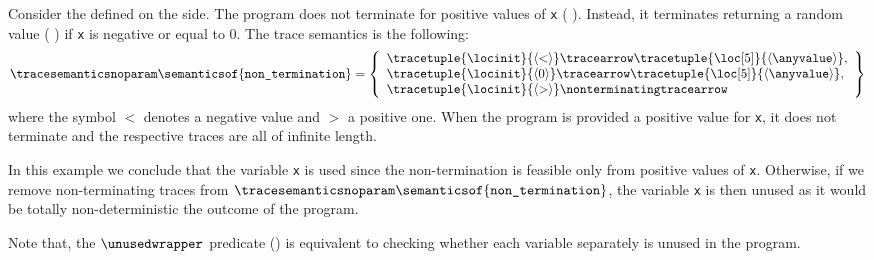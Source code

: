 \begin{example}
  Consider the  defined on the side. The program does not terminate for positive values of \texttt{x} (\cf{} ). Instead, it terminates returning a random value (\cf{} ) if \texttt{x} is negative or equal to $0$. The trace semantics is the following:
  \begin{align*}
    \tracesemanticsnoparam\semanticsof{\texttt{non\_termination}}
    =
    \left\{
    \begin{array}{l}
        \tracetuple{\locinit}{\langle{<}\rangle}\tracearrow\tracetuple{\loc[5]}{\langle{\anyvalue}\rangle}, \\
        \tracetuple{\locinit}{\langle{0}\rangle}\tracearrow\tracetuple{\loc[5]}{\langle{\anyvalue}\rangle}, \\
        \tracetuple{\locinit}{\langle{>}\rangle}\nonterminatingtracearrow\
    \end{array}
    \right\}
  \end{align*}
  where the symbol $<$ denotes a negative value and $>$ a positive one. When the program is provided a positive value for \texttt{x}, it does not terminate and the respective traces are all of infinite length.

  In this example we conclude that the variable \texttt{x} is used since the non-termination is feasible only from positive values of \texttt{x}.
  Otherwise, if we remove non-terminating traces from $\tracesemanticsnoparam\semanticsof{\texttt{non\_termination}}$, the variable \texttt{x} is then unused as it would be totally non-deterministic the outcome of the program.
\end{example}

Note that, the $\unusedwrapper$ predicate () is equivalent to checking whether each variable separately is unused in the program.


